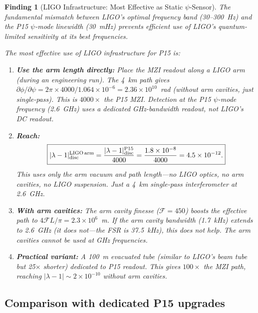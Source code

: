 \documentclass[11pt]{article}
\newtheorem{finding}{Finding}
\newcommand{\ee}[1]{\times 10^{#1}}
\newcommand{\lam}{\lambda}
\begin{document}
\begin{finding}[LIGO Infrastructure: Most Effective as Static $\psi$-Sensor]
\label{find:ligo}
The fundamental mismatch between LIGO's optimal frequency band
(30--300~Hz) and the P15 $\psi$-mode linewidth (30~mHz) prevents
efficient use of LIGO's quantum-limited sensitivity at its best
frequencies.

The most effective use of LIGO infrastructure for P15 is:
\begin{enumerate}
\item \textbf{Use the arm length directly:} Place the MZI readout
along a LIGO arm (during an engineering run). The 4~km path gives
$\partial\phi/\partial\psi = 2\pi \times 4000/1.064\ee{-6}
= 2.36\ee{10}$~rad (without arm cavities, just single-pass).
This is $4000\times$ the P15 MZI. Detection at the P15 $\psi$-mode
frequency (2.6~GHz) uses a dedicated GHz-bandwidth readout, not
LIGO's DC readout.

\item \textbf{Reach:}
\begin{equation}
\boxed{|\lam-1|_{\rm disc}^{\rm LIGO\,arm}
= \frac{|\lam-1|_{\rm disc}^{\rm P15}}{4000}
= \frac{1.8\ee{-8}}{4000} = 4.5\ee{-12}.}
\end{equation}
This uses only the arm vacuum and path length---no LIGO optics,
no arm cavities, no LIGO suspension. Just a 4~km single-pass
interferometer at 2.6~GHz.

\item \textbf{With arm cavities:} The arm cavity finesse
($\mathcal{F} = 450$) boosts the effective path to
$4\mathcal{F}L/\pi = 2.3\ee{6}$~m. If the arm cavity bandwidth
(1.7~kHz) extends to 2.6~GHz (it does not---the FSR is 37.5~kHz),
this does not help. The arm cavities cannot be used at GHz frequencies.

\item \textbf{Practical variant:} A 100~m evacuated tube (similar to
LIGO's beam tube but 25$\times$ shorter) dedicated to P15
readout. This gives $100\times$ the MZI path, reaching
$|\lam-1| \sim 2\ee{-10}$ without arm cavities.
\end{enumerate}
\end{finding}

\subsection{Comparison with dedicated P15 upgrades}
\end{document}
